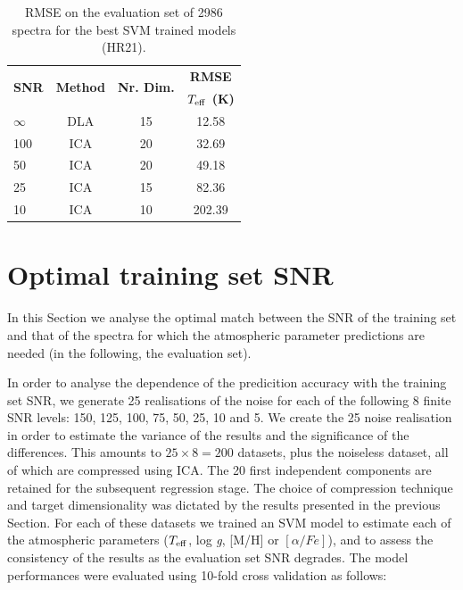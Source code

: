 \documentclass[a4paper,fleqn,usenatbib]{mnras}
\begin{document}
{\begin{table}
\centering
\caption{RMSE on the evaluation set of 2986 spectra for the best SVM trained models (HR21).}
\label{tab:hr21}
\begin{tabular}{l c c c}
\hline
\multirow{2}{*}{\textbf{SNR}} & \multirow{2}{*}{\textbf{Method}} & \multirow{2}{*}{\textbf{Nr. Dim.}} & {\bf RMSE}\\
 &  &  & \textbf{$T_{\rm eff}$ (K)}\\
\hline
$\infty$ & DLA & 15 & 12.58\\
100 & ICA & 20 & 32.69\\
50 & ICA & 20 & 49.18\\
25 & ICA & 15 & 82.36\\
10 & ICA & 10 & 202.39\\
\hline
\end{tabular}
\end{table}

\section{Optimal training set SNR}
\label{sec:comparison2}

In this Section we analyse the optimal match between the SNR of the training
set and that of the spectra for which the atmospheric parameter
predictions are needed (in the following, the evaluation set).

In order to analyse the dependence of the predicition accuracy with
the training set SNR, we generate 25 realisations of the noise for
each of the following 8 finite SNR levels: 150, 125, 100, 75, 50, 25,
10 and 5. We create the 25 noise realisation in order to estimate the
variance of the results and the significance of the differences. 
This amounts to $25\times 8=200$ datasets, plus the
noiseless dataset, all of which are compressed using ICA. The 20 
first independent components are retained for the subsequent 
regression stage. The choice of compression technique and target 
dimensionality was dictated by the results presented in the previous 
Section. For each of these datasets we trained an SVM
model to estimate each of the atmospheric parameters ($T_{\rm
  eff}$, log \textit{g}, [M/H] or $\left[ \alpha/Fe \right]$), and to 
assess the consistency of the results as the evaluation set SNR degrades. 
The model performances were evaluated using 10-fold cross validation 
as follows:

}
\end{document}
